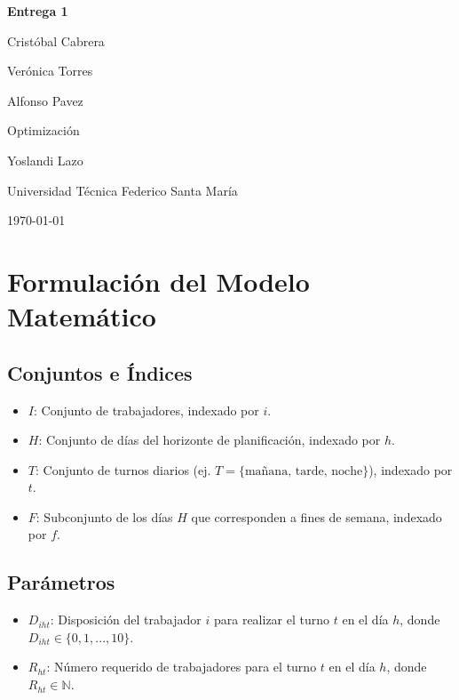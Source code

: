 \documentclass{article}
\begin{document}
\begin{titlepage}
    \centering
    \vspace*{5cm} 

    {\Huge \bfseries Entrega 1 \par}
    
    \vspace{1.5cm}

    {\Large Cristóbal Cabrera \par}
    {\Large Verónica Torres \par}    
    {\Large Alfonso Pavez \par}    
    \vspace{2cm} 
    
    {\large Optimización \par}
    {\large Yoslandi Lazo \par}
    {\large Universidad Técnica Federico Santa María\par}
    
    \vspace{1.5cm}
    
    {\large \today \par} %
    \vfill 
    
\end{titlepage}


\section*{Formulación del Modelo Matemático}

\subsection*{Conjuntos e Índices}
\begin{itemize}
    \item $I$: Conjunto de trabajadores, indexado por $i$.
    \item $H$: Conjunto de días del horizonte de planificación, indexado por $h$.
    \item $T$: Conjunto de turnos diarios (ej. $T = \{\text{mañana, tarde, noche}\}$), indexado por $t$.
    \item $F$: Subconjunto de los días $H$ que corresponden a fines de semana, indexado por $f$.
\end{itemize}

\subsection*{Parámetros}
\begin{itemize}
    \item $D_{iht}$: Disposición del trabajador $i$ para realizar el turno $t$ en el día $h$, donde $D_{iht} \in \{0, 1, ..., 10\}$.
    \item $R_{ht}$: Número requerido de trabajadores para el turno $t$ en el día $h$, donde $R_{ht} \in \mathbb{N}$.
\end{itemize}
\end{document}
